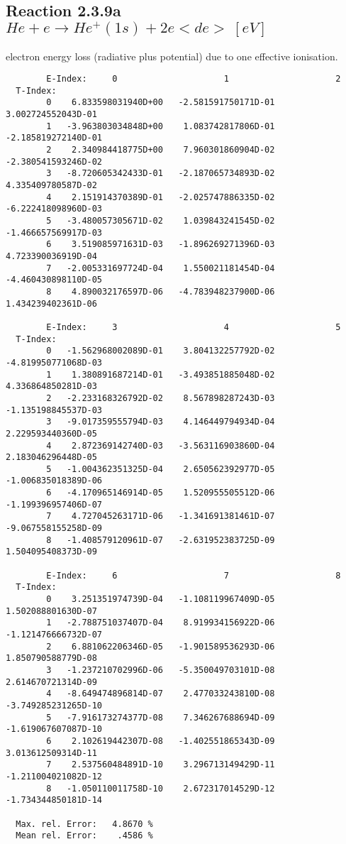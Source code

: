 \documentclass[12pt]{article}
\begin{document}
\subsection{
  Reaction 2.3.9a  $He + e \rightarrow He^+(1s) + 2e   <de> \ [eV] $
}

  electron energy loss (radiative plus potential) due to one effective ionisation.

\begin{small}\begin{verbatim}
        E-Index:     0                     1                     2
  T-Index:
        0    6.833598031940D+00   -2.581591750171D-01    3.002724552043D-01
        1   -3.963803034848D+00    1.083742817806D-01   -2.185819272140D-01
        2    2.340984418775D+00    7.960301860904D-02   -2.380541593246D-02
        3   -8.720605342433D-01   -2.187065734893D-02    4.335409780587D-02
        4    2.151914370389D-01   -2.025747886335D-02   -6.222418098960D-03
        5   -3.480057305671D-02    1.039843241545D-02   -1.466657569917D-03
        6    3.519085971631D-03   -1.896269271396D-03    4.723390036919D-04
        7   -2.005331697724D-04    1.550021181454D-04   -4.460430898110D-05
        8    4.890032176597D-06   -4.783948237900D-06    1.434239402361D-06

        E-Index:     3                     4                     5
  T-Index:
        0   -1.562968002089D-01    3.804132257792D-02   -4.819950771068D-03
        1    1.380891687214D-01   -3.493851885048D-02    4.336864850281D-03
        2   -2.233168326792D-02    8.567898287243D-03   -1.135198845537D-03
        3   -9.017359555794D-03    4.146449794934D-04    2.229593440360D-05
        4    2.872369142740D-03   -3.563116903860D-04    2.183046296448D-05
        5   -1.004362351325D-04    2.650562392977D-05   -1.006835018389D-06
        6   -4.170965146914D-05    1.520955505512D-06   -1.199396957406D-07
        7    4.727045263171D-06   -1.341691381461D-07   -9.067558155258D-09
        8   -1.408579120961D-07   -2.631952383725D-09    1.504095408373D-09

        E-Index:     6                     7                     8
  T-Index:
        0    3.251351974739D-04   -1.108119967409D-05    1.502088801630D-07
        1   -2.788751037407D-04    8.919934156922D-06   -1.121476666732D-07
        2    6.881062206346D-05   -1.901589536293D-06    1.850790588779D-08
        3   -1.237210702996D-06   -5.350049703101D-08    2.614670721314D-09
        4   -8.649474896814D-07    2.477033243810D-08   -3.749285231265D-10
        5   -7.916173274377D-08    7.346267688694D-09   -1.619067607087D-10
        6    2.102619442307D-08   -1.402551865343D-09    3.013612509314D-11
        7    2.537560484891D-10    3.296713149429D-11   -1.211004021082D-12
        8   -1.050110011758D-10    2.672317014529D-12   -1.734344850181D-14

  Max. rel. Error:   4.8670 %
  Mean rel. Error:    .4586 %

\end{verbatim}\end{small}
\end{document}
